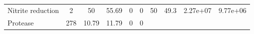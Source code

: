 \documentclass[]{article}
\begin{document}
\begin{longtable}[]{@{}lccccccccc@{}}
\begin{minipage}[t]{0.07\columnwidth}
Nitrite reduction\strut
\end{minipage} & \begin{minipage}[t]{0.06\columnwidth}\centering\strut
2\strut
\end{minipage} & \begin{minipage}[t]{0.08\columnwidth}\centering\strut
50\strut
\end{minipage} & \begin{minipage}[t]{0.08\columnwidth}\centering\strut
55.69\strut
\end{minipage} & \begin{minipage}[t]{0.08\columnwidth}\centering\strut
0\strut
\end{minipage} & \begin{minipage}[t]{0.08\columnwidth}\centering\strut
0\strut
\end{minipage} & \begin{minipage}[t]{0.08\columnwidth}\centering\strut
50\strut
\end{minipage} & \begin{minipage}[t]{0.08\columnwidth}\centering\strut
49.3\strut
\end{minipage} & \begin{minipage}[t]{0.08\columnwidth}\centering\strut
2.27e+07\strut
\end{minipage} & \begin{minipage}[t]{0.08\columnwidth}\centering\strut
9.77e+06\strut
\end{minipage}\tabularnewline
\begin{minipage}[t]{0.07\columnwidth}\raggedright\strut
Protease\strut
\end{minipage} & \begin{minipage}[t]{0.06\columnwidth}\centering\strut
278\strut
\end{minipage} & \begin{minipage}[t]{0.08\columnwidth}\centering\strut
10.79\strut
\end{minipage} & \begin{minipage}[t]{0.08\columnwidth}\centering\strut
11.79\strut
\end{minipage} & \begin{minipage}[t]{0.08\columnwidth}\centering\strut
0\strut
\end{minipage} & \begin{minipage}[t]{0.08\columnwidth}\centering\strut
0\strut
\end{minipage} & \begin{minipage}[t]{0.08\columnwidth}\centering\strut

\end{minipage}
\end{longtable}
\end{document}
